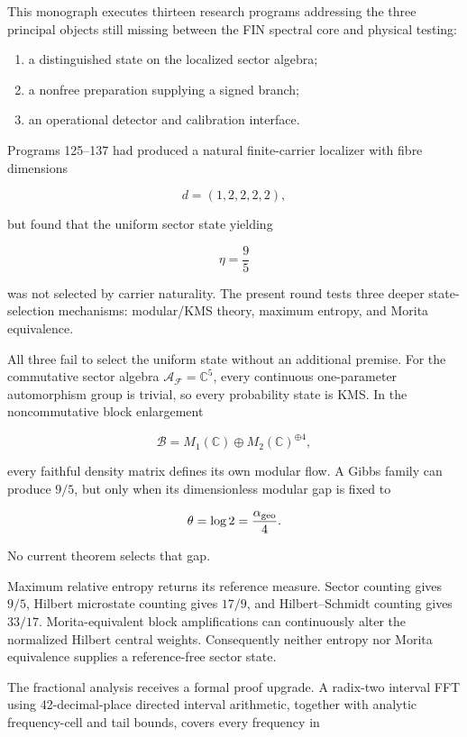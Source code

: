 \documentclass[11pt,a4paper,openany]{report}
\begin{document}
This monograph executes thirteen research programs addressing the three principal objects still missing between the FIN spectral core and physical testing:

\begin{enumerate}
\item 
a distinguished state on the localized sector algebra;

\item 
a nonfree preparation supplying a signed branch;

\item 
an operational detector and calibration interface.

\end{enumerate}

Programs 125--137 had produced a natural finite-carrier localizer with fibre dimensions

\[
d=(1,2,2,2,2),
\]

but found that the uniform sector state yielding

\[
\eta=\frac95
\]

was not selected by carrier naturality. The present round tests three deeper state-selection mechanisms: modular/\allowbreak{}KMS theory, maximum entropy, and Morita equivalence.

All three fail to select the uniform state without an additional premise. For the commutative sector algebra \(\mathcal A_{\mathcal F}=\mathbb C^5\), every continuous one-parameter automorphism group is trivial, so every probability state is KMS. In the noncommutative block enlargement

\[
\mathcal B
=
M_1(\mathbb C)\oplus M_2(\mathbb C)^{\oplus4},
\]

every faithful density matrix defines its own modular flow. A Gibbs family can produce \(9/5\), but only when its dimensionless modular gap is fixed to

\[
\theta=\log2=\frac{\alpha_{\rm geo}}4.
\]

No current theorem selects that gap.

Maximum relative entropy returns its reference measure. Sector counting gives \(9/5\), Hilbert microstate counting gives \(17/9\), and Hilbert--Schmidt counting gives \(33/17\). Morita-equivalent block amplifications can continuously alter the normalized Hilbert central weights. Consequently neither entropy nor Morita equivalence supplies a reference-free sector state.

The fractional analysis receives a formal proof upgrade. A radix-two interval FFT using 42-decimal-place directed interval arithmetic, together with analytic frequency-cell and tail bounds, covers every frequency in
\end{document}
